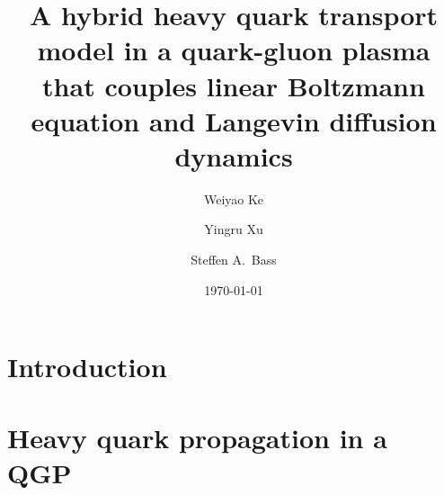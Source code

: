 \documentclass[aps, prc, reprint, amsmath, groupedaddress, nofootinbib]{revtex4-1}
\begin{document}
\title{A hybrid heavy quark transport model in a quark-gluon plasma that couples linear Boltzmann equation and Langevin diffusion dynamics}
\author{Weiyao Ke}
\author{Yingru Xu}
\author{Steffen A.\ Bass}
\date{\today}
\maketitle

\section{Introduction}

\section{Heavy quark propagation in a QGP}
\end{document}
